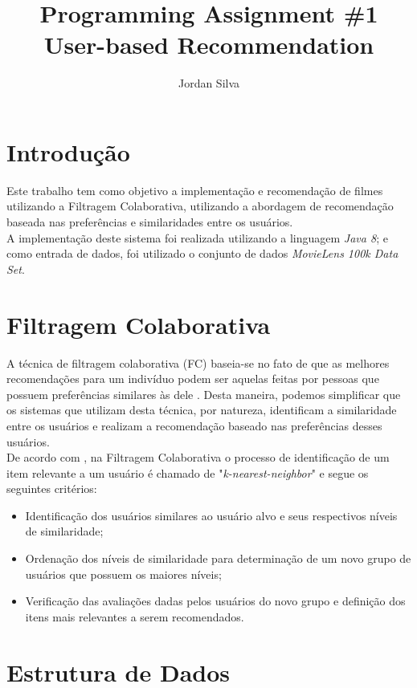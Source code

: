 \documentclass[12pt]{article}
\title{Programming Assignment \#1\\ User-based Recommendation}
\author{Jordan Silva\inst{1} }
\begin{document}
 

\maketitle


\section{Introdução}

Este trabalho tem como objetivo a implementação e recomendação de filmes utilizando a Filtragem Colaborativa, utilizando a abordagem de recomendação baseada nas preferências e similaridades entre os usuários.
\\
\indent A implementação deste sistema foi realizada utilizando a linguagem \textit{Java 8}; e como entrada de dados, foi utilizado o conjunto de dados \textit{MovieLens 100k Data Set}\cite{movielens100k}.

\section{Filtragem Colaborativa} \label{sec:filtragem}

A técnica de filtragem colaborativa (FC) baseia-se no fato de que as melhores recomendações para um indivíduo podem ser aquelas feitas por pessoas que possuem preferências similares às dele \cite{sampaio2006aprendizagem}. Desta maneira, podemos simplificar que os sistemas que utilizam desta técnica, por natureza, identificam a similaridade entre os usuários e realizam a recomendação baseado nas preferências desses usuários.\\
\indent De acordo com \cite{kajimoto2007sistemas}, na Filtragem Colaborativa o processo de identificação de um item relevante a um usuário é chamado de "\textit{k-nearest-neighbor}" e segue os seguintes critérios: 
 
\begin{itemize}
\item Identificação dos usuários similares ao usuário alvo e seus respectivos níveis de similaridade;
\item Ordenação dos níveis de similaridade para determinação de um novo grupo de usuários que possuem os maiores níveis; 
\item Verificação das avaliações dadas pelos usuários do novo grupo e definição dos itens mais relevantes a serem recomendados.
\end{itemize} 

\section{Estrutura de Dados} \label{sec:estrutura-dados}
\end{document}
